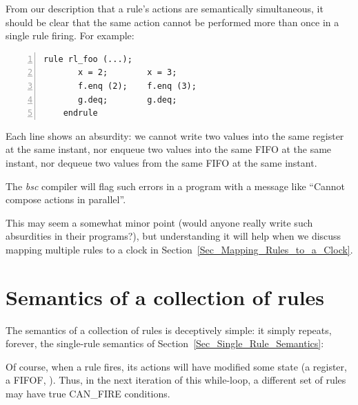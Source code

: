 \label{Sec_Parallel_Conflict}

From our description that a rule's actions are semantically
simultaneous, it should be clear that the same action cannot be
performed more than once in a single rule firing.  For example:

{\small
\begin{Verbatim}[frame=single, numbers=left]
    rule rl_foo (...);
       x = 2;        x = 3;
       f.enq (2);    f.enq (3);
       g.deq;        g.deq;
    endrule
\end{Verbatim}
}

Each line shows an absurdity: we cannot write two values into the same
register at the same instant, nor enqueue two values into the same
FIFO at the same instant, nor dequeue two values from the same FIFO at
the same instant.

The \emph{bsc} compiler will flag such errors in a program with a
message like ``Cannot compose actions in parallel''.

This may seem a somewhat minor point (would anyone really write such
absurdities in their programs?), but understanding it will help when
we discuss mapping multiple rules to a clock in
Section~\ref{Sec_Mapping_Rules_to_a_Clock}.


\section{Semantics of a collection of rules}

\label{Sec_Rules_Semantics}


The semantics of a collection of rules is deceptively simple: it
simply repeats, forever, the single-rule semantics of
Section~\ref{Sec_Single_Rule_Semantics}:

\begin{center}
\end{center}

Of course, when a rule fires, its actions will have modified some
state (a register, a FIFOF, {\etc}).  Thus, in the next iteration of
this while-loop, a different set of rules may have true CAN\_FIRE
conditions.

